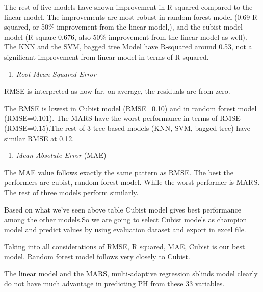 \documentclass[]{article}
\providecommand{\tightlist}{%
  \setlength{\itemsep}{0pt}\setlength{\parskip}{0pt}}
\begin{document}
The rest of five models have shown improvement in R-squared compared to
the linear model. The improvements are most robust in random forest
model (0.69 R squared, or 50\% improvement from the linear model,), and
the cubist model model (R-square 0.676, also 50\% improvement from the
linear model as well). The KNN and the SVM, bagged tree Model have
R-squared around 0.53, not a significant improvement from linear model
in terms of R squared.

\begin{enumerate}
\def\labelenumi{\arabic{enumi}.}
\setcounter{enumi}{1}
\tightlist
\item
  \emph{Root Mean Squared Error}
\end{enumerate}

RMSE is interpreted as how far, on average, the residuals are from zero.

The RMSE is lowest in Cubist model (RMSE=0.10) and in random forest
model (RMSE=0.101). The MARS have the worst performance in terms of RMSE
(RMSE=0.15).The rest of 3 tree based models (KNN, SVM, bagged tree) have
similar RMSE at 0.12.

\begin{enumerate}
\def\labelenumi{\arabic{enumi}.}
\setcounter{enumi}{2}
\tightlist
\item
  \emph{Mean Absolute Error} (MAE)
\end{enumerate}

The MAE value follows exactly the same pattern as RMSE. The best the
performers are cubist, random forest model. While the worst performer is
MARS. The rest of three models perform similarly.

Based on what we've seen above table Cubist model gives best performance
among the other models.So we are going to select Cubist models as
champion model and predict values by using evaluation dataset and export
in excel file.

Taking into all considerations of RMSE, R squared, MAE, Cubist is our
best model. Random forest model follows very closely to Cubist.

The linear model and the MARS, multi-adaptive regression sblinds model
clearly do not have much advantage in predicting PH from these 33
variables.
\end{document}
